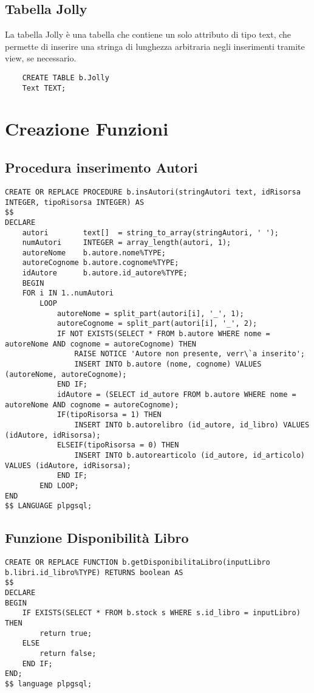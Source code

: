 \subsection{Tabella Jolly}
La tabella Jolly \`e una tabella che contiene un solo attributo di tipo text, che permette di
inserire una stringa di lunghezza arbitraria negli inserimenti tramite view, se necessario.
\begin{lstlisting}
    CREATE TABLE b.Jolly
    Text TEXT;
\end{lstlisting}

\section{Creazione Funzioni}

\subsection{Procedura inserimento Autori}
\begin{lstlisting}
CREATE OR REPLACE PROCEDURE b.insAutori(stringAutori text, idRisorsa INTEGER, tipoRisorsa INTEGER) AS
$$
DECLARE
    autori        text[]  = string_to_array(stringAutori, ' ');
    numAutori     INTEGER = array_length(autori, 1);
    autoreNome    b.autore.nome%TYPE;
    autoreCognome b.autore.cognome%TYPE;
    idAutore      b.autore.id_autore%TYPE;
    BEGIN
    FOR i IN 1..numAutori
        LOOP
            autoreNome = split_part(autori[i], '_', 1);
            autoreCognome = split_part(autori[i], '_', 2);
            IF NOT EXISTS(SELECT * FROM b.autore WHERE nome = autoreNome AND cognome = autoreCognome) THEN
                RAISE NOTICE 'Autore non presente, verr\`a inserito';
                INSERT INTO b.autore (nome, cognome) VALUES (autoreNome, autoreCognome);
            END IF;
            idAutore = (SELECT id_autore FROM b.autore WHERE nome = autoreNome AND cognome = autoreCognome);
            IF(tipoRisorsa = 1) THEN
                INSERT INTO b.autorelibro (id_autore, id_libro) VALUES (idAutore, idRisorsa);
            ELSEIF(tipoRisorsa = 0) THEN
                INSERT INTO b.autorearticolo (id_autore, id_articolo) VALUES (idAutore, idRisorsa);
            END IF;
        END LOOP;
END
$$ LANGUAGE plpgsql;
\end{lstlisting}

\subsection{Funzione Disponibilit\`a Libro}
\begin{lstlisting}
CREATE OR REPLACE FUNCTION b.getDisponibilitaLibro(inputLibro b.libri.id_libro%TYPE) RETURNS boolean AS
$$
DECLARE
BEGIN
    IF EXISTS(SELECT * FROM b.stock s WHERE s.id_libro = inputLibro) THEN
        return true;
    ELSE
        return false;
    END IF;
END;
$$ language plpgsql;
\end{lstlisting}

